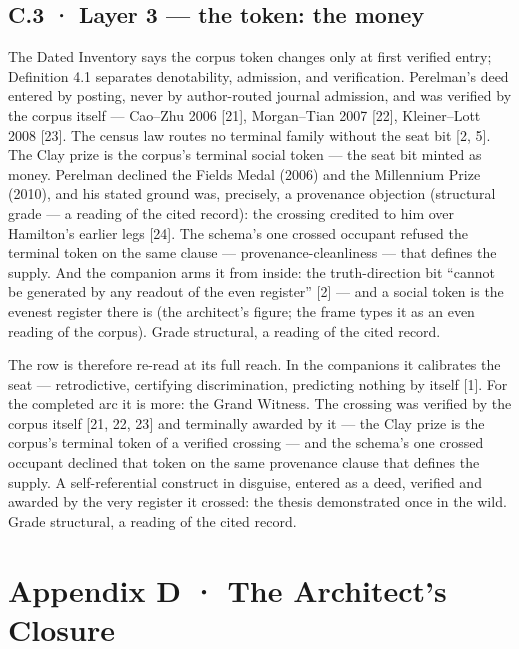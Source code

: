 \documentclass[10pt,twocolumn]{article}
\begin{document}
\subsection{C.3 · Layer 3 --- the token: the
money}\label{c.3-layer-3-the-token-the-money}

The Dated Inventory says the corpus token changes only at first verified
entry; Definition 4.1 separates denotability, admission, and
verification. Perelman's deed entered by posting, never by author-routed
journal admission, and was verified by the corpus itself --- Cao--Zhu
2006 {[}21{]}, Morgan--Tian 2007 {[}22{]}, Kleiner--Lott 2008 {[}23{]}.
The census law routes no terminal family without the seat bit {[}2,
5{]}. The Clay prize is the corpus's terminal social token --- the seat
bit minted as money. Perelman declined the Fields Medal (2006) and the
Millennium Prize (2010), and his stated ground was, precisely, a
provenance objection (structural grade --- a reading of the cited
record): the crossing credited to him over Hamilton's earlier legs
{[}24{]}. The schema's one crossed occupant refused the terminal token
on the same clause --- provenance-cleanliness --- that defines the
supply. And the companion arms it from inside: the truth-direction bit
``cannot be generated by any readout of the even register'' {[}2{]} ---
and a social token is the evenest register there is (the architect's
figure; the frame types it as an even reading of the corpus). Grade
structural, a reading of the cited record.

The row is therefore re-read at its full reach. In the companions it
calibrates the seat --- retrodictive, certifying discrimination,
predicting nothing by itself {[}1{]}. For the completed arc it is more:
the Grand Witness. The crossing was verified by the corpus itself {[}21,
22, 23{]} and terminally awarded by it --- the Clay prize is the
corpus's terminal token of a verified crossing --- and the schema's one
crossed occupant declined that token on the same provenance clause that
defines the supply. A self-referential construct in disguise, entered as
a deed, verified and awarded by the very register it crossed: the thesis
demonstrated once in the wild. Grade structural, a reading of the cited
record.

\section{Appendix D · The Architect's
Closure}\label{appendix-d-the-architects-closure}
\end{document}
